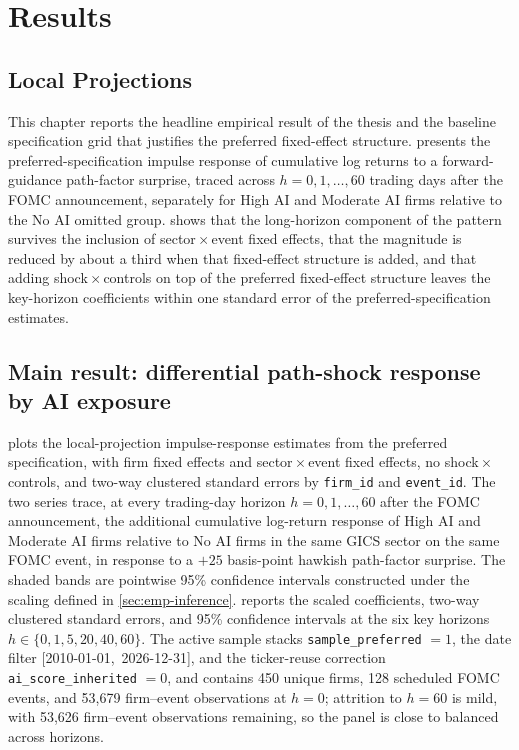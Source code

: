 \chapter{Results}
\label{ch:results}

\section{Local Projections}

This chapter reports the headline empirical result of the thesis and the
baseline specification grid that justifies the preferred fixed-effect
structure.  presents the preferred-specification impulse
response of cumulative log returns to a forward-guidance path-factor
surprise, traced across $h = 0, 1, \dots, 60$ trading days after the FOMC
announcement, separately for High AI and Moderate AI firms relative to the
No AI omitted group.  shows that the long-horizon
component of the pattern survives the inclusion of sector\,$\times$\,event
fixed effects, that the magnitude is reduced by about a third when that
fixed-effect structure is added, and that adding shock\,$\times$\,controls
on top of the preferred fixed-effect structure leaves the key-horizon
coefficients within one standard error of the preferred-specification
estimates.

\section{Main result: differential path-shock response by AI exposure}
\label{sec:res-main}

 plots the local-projection impulse-response
estimates from the preferred specification, with firm fixed effects and
sector\,$\times$\,event fixed effects, no shock\,$\times$\,controls, and
two-way clustered standard errors by \texttt{firm\_id} and \texttt{event\_id}.
The two series trace, at every trading-day horizon
$h = 0, 1, \dots, 60$ after the FOMC announcement, the additional
cumulative log-return response of High AI and Moderate AI firms relative
to No AI firms in the same GICS sector on the same FOMC event, in response
to a $+25$ basis-point hawkish path-factor surprise. The shaded bands are
pointwise 95\% confidence intervals constructed under the scaling defined
in \cref{sec:emp-inference}.  reports the
scaled coefficients, two-way clustered standard errors, and 95\%
confidence intervals at the six key horizons $h \in \{0, 1, 5, 20, 40, 60\}$.
The active sample stacks \texttt{sample\_preferred} $= 1$, the date filter
\mbox{[2010-01-01, 2026-12-31]}, and the ticker-reuse correction
\texttt{ai\_score\_inherited} $= 0$, and contains 450 unique firms, 128
scheduled FOMC events, and 53{,}679 firm--event observations at $h = 0$;
attrition to $h = 60$ is mild, with 53{,}626 firm--event observations
remaining, so the panel is close to balanced across horizons.

